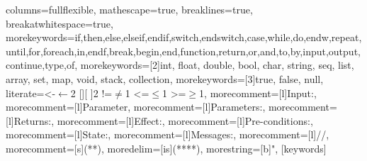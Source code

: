 %
%   
%
%   
%
%   
%

\usepackage{listings}
%
  {%
   columns=fullflexible,
   mathescape=true,
   breaklines=true,
   breakatwhitespace=true,
   morekeywords={if,then,else,elseif,endif,switch,endswitch,case,while,do,endw,repeat,until,for,foreach,in,endf,break,begin,end,function,return,or,and,to,by,input,output,continue,type,of},
   morekeywords=[2]{int, float, double, bool, char, string, seq, list, array, set, map, void, stack, collection},
   morekeywords=[3]{true, false, null},
   literate={<-}{{${}\leftarrow{}$}}{2} {[]}{[ ]}{2} {!=}{{${}\not={}$}}{1} {<=}{${}\leq{}$}{1} {>=}{${}\geq{}$}{1},
   morecomment=[l]{Input:},
   morecomment=[l]{Parameter},
   morecomment=[l]{Parameters:},
   morecomment=[l]{Returns:},
   morecomment=[l]{Effect:},
   morecomment=[l]{Pre-conditions:},
   morecomment=[l]{State:},
   morecomment=[l]{Messages:},
   morecomment=[l]{//},
   morecomment=[s]{(*}{*)},
   moredelim=[is]{(**}{**)},
   morestring=[b]",
  }
  [keywords]

